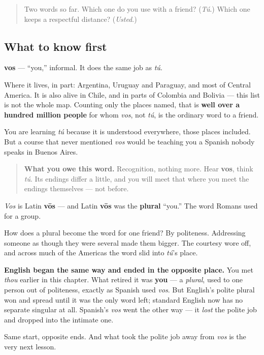 \begin{quote}
Two words so far. Which one do you use with a friend? (\emph{Tú}.) Which one keeps a respectful distance? (\emph{Usted}.)
\end{quote}

\subsection*{What to know first}
\textbf{vos} — \textquotedblleft{}you,\textquotedblright{} informal. It does the same job as \emph{tú}.

Where it lives, in part: Argentina, Uruguay and Paraguay, and most of Central America. It is also alive in Chile, and in parts of Colombia and Bolivia — this list is not the whole map. Counting only the places named, that is \textbf{well over a hundred million people} for whom \emph{vos}, not \emph{tú}, is the ordinary word to a friend.

You are learning \emph{tú} because it is understood everywhere, those places included. But a course that never mentioned \emph{vos} would be teaching you a Spanish nobody speaks in Buenos Aires.

\begin{quote}
\textbf{What you owe this word.} Recognition, nothing more. Hear \textbf{vos}, think \emph{tú}. Its endings differ a little, and you will meet that where you meet the endings themselves — not before.
\end{quote}

\begin{cousinweb}
\emph{Vos} is Latin \textbf{vōs} — and Latin \textbf{vōs} was the \textbf{plural} \textquotedblleft{}you.\textquotedblright{} The word Romans used for a group.

How does a plural become the word for one friend? By politeness. Addressing someone as though they were several made them bigger. The courtesy wore off, and across much of the Americas the word slid into \emph{tú}'s place.

\textbf{English began the same way and ended in the opposite place.} You met \emph{thou} earlier in this chapter. What retired it was \textbf{you} — a \emph{plural}, used to one person out of politeness, exactly as Spanish used \emph{vos}. But English's polite plural won and spread until it was the only word left; standard English now has no separate singular at all. Spanish's \emph{vos} went the other way — it \emph{lost} the polite job and dropped into the intimate one.

Same start, opposite ends. And what took the polite job away from \emph{vos} is the very next lesson.
\end{cousinweb}

